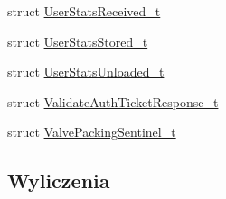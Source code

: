 \begin{DoxyCompactItemize}
\item 
struct \hyperlink{struct_valve_1_1_steamworks_1_1_user_stats_received__t}{User\+Stats\+Received\+\_\+t}
\item 
struct \hyperlink{struct_valve_1_1_steamworks_1_1_user_stats_stored__t}{User\+Stats\+Stored\+\_\+t}
\item 
struct \hyperlink{struct_valve_1_1_steamworks_1_1_user_stats_unloaded__t}{User\+Stats\+Unloaded\+\_\+t}
\item 
struct \hyperlink{struct_valve_1_1_steamworks_1_1_validate_auth_ticket_response__t}{Validate\+Auth\+Ticket\+Response\+\_\+t}
\item 
struct \hyperlink{struct_valve_1_1_steamworks_1_1_valve_packing_sentinel__t}{Valve\+Packing\+Sentinel\+\_\+t}
\end{DoxyCompactItemize}
\subsection*{Wyliczenia}
